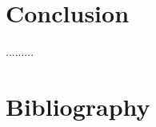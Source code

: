 \documentclass[12pt]{article}
\begin{document}
\section{Conclusion}

.........

 \section{Bibliography}
 
 
\end{document}
